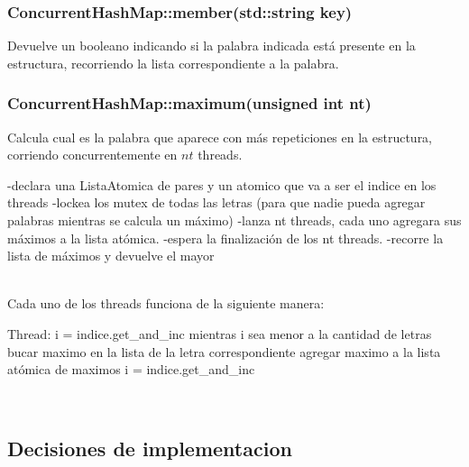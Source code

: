 \subsubsection{ConcurrentHashMap::member(std::string key)}
Devuelve un booleano indicando si la palabra indicada está presente en la estructura, recorriendo la lista correspondiente a la palabra.

\subsubsection{ConcurrentHashMap::maximum(unsigned int nt)}
Calcula cual es la palabra que aparece con más repeticiones en la estructura, corriendo concurrentemente en $nt$ threads.\\
\begin{codesnippet}
 	-declara una ListaAtomica de pares y un atomico que va a ser el indice en los threads
 	-lockea los mutex de todas las letras
 	(para que nadie pueda agregar palabras mientras se calcula un máximo)
 	-lanza nt threads, cada uno agregara sus máximos a la lista atómica.
 	-espera la finalización de los nt threads.
 	-recorre la lista de máximos y devuelve el mayor
\end{codesnippet}\\
Cada uno de los threads funciona de la siguiente manera:\\
\begin{codesnippet}
 	Thread:
 		i = indice.get_and_inc
 		mientras i sea menor a la cantidad de letras
 			bucar maximo en la lista de la letra correspondiente
 			agregar maximo a la lista atómica de maximos
 			i = indice.get_and_inc

\end{codesnippet}\\


\subsection{Decisiones de implementacion} %
